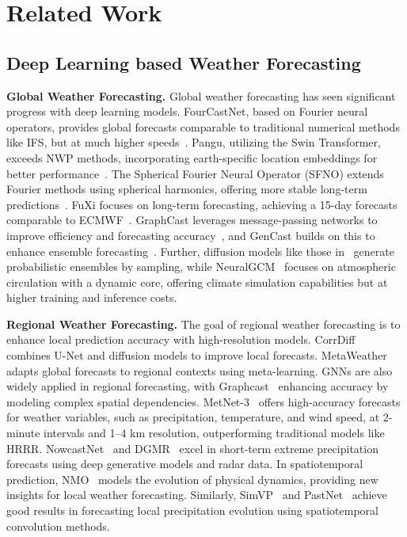 \section{Related Work}
\subsection{Deep Learning based Weather Forecasting}
\textbf{Global Weather Forecasting.} Global weather forecasting has seen significant progress with deep learning models. FourCastNet, based on Fourier neural operators, provides global forecasts comparable to traditional numerical methods like IFS, but at much higher speeds~\cite{pathak2022fourcastnet}. Pangu, utilizing the Swin Transformer, exceeds NWP methods, incorporating earth-specific location embeddings for better performance~\cite{bi2023accurate}. The Spherical Fourier Neural Operator (SFNO) extends Fourier methods using spherical harmonics, offering more stable long-term predictions~\cite{bonev2023spherical}. FuXi focuses on long-term forecasting, achieving a 15-day forecasts comparable to ECMWF~\cite{chen2023fuxi}. GraphCast leverages message-passing networks to improve efficiency and forecasting accuracy~\cite{lam2023learning}, and GenCast builds on this to enhance ensemble forecasting~\cite{price2023gencast}. Further, diffusion models like those in~\cite{li2024generative} generate probabilistic ensembles by sampling, while NeuralGCM~\cite{kochkov2024neural} focuses on atmospheric circulation with a dynamic core, offering climate simulation capabilities but at higher training and inference costs. 

\textbf{Regional Weather Forecasting.} The goal of regional weather forecasting is to enhance local prediction accuracy with high-resolution models. CorrDiff~\cite{mardani2023generative} combines U-Net and diffusion models to improve local forecasts. MetaWeather~\cite{kim2024metaweather} adapts global forecasts to regional contexts using meta-learning. GNNs are also widely applied in regional forecasting, with Graphcast~\cite{lam2023learning} enhancing accuracy by modeling complex spatial dependencies. MetNet-3~\cite{espeholt2022deep} offers high-accuracy forecasts for weather variables, such as precipitation, temperature, and wind speed, at 2-minute intervals and 1–4 km resolution, outperforming traditional models like HRRR. NowcastNet~\cite{zhang2023skilful} and DGMR~\cite{ravuri2021skilful} excel in short-term extreme precipitation forecasts using deep generative models and radar data. In spatiotemporal prediction, NMO~\cite{wu2024neural} models the evolution of physical dynamics, providing new insights for local weather forecasting. Similarly, SimVP~\cite{gao2022simvp} and PastNet~\cite{wu2024pastnet} achieve good results in forecasting local precipitation evolution using spatiotemporal convolution methods.
    
